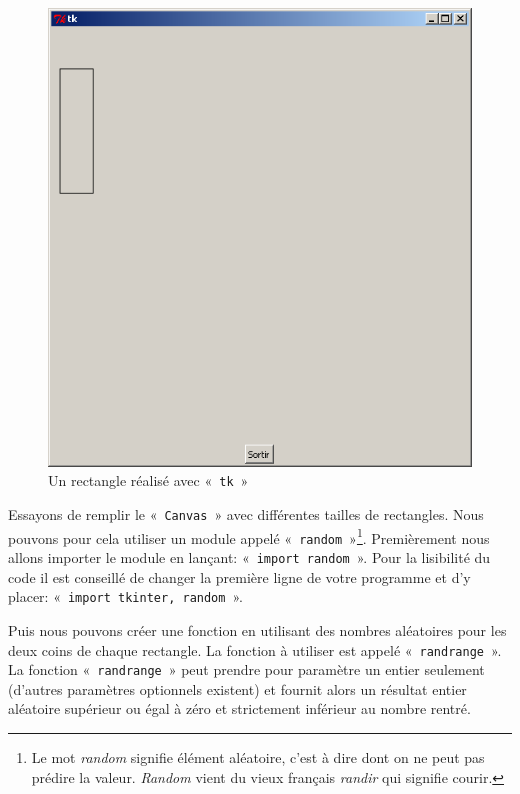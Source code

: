 \begin{figure}[h!]
\centering
\includegraphics[scale=0.4]{images/rectangle}
\caption{Un rectangle réalisé avec « \texttt{tk} »}\label{fig:rectangle}
\end{figure}
 
Essayons de remplir le « \texttt{Canvas} » avec différentes tailles de rectangles. Nous pouvons pour cela utiliser un module appelé « \texttt{random} »\footnote{Le mot \emph{random} signifie élément aléatoire, c'est à dire dont on ne peut pas prédire la valeur. \emph{Random} vient du vieux français \emph{randir} qui signifie courir.}. Premièrement nous allons importer le module en lançant: « \texttt{import random} ». Pour la lisibilité du code il est conseillé de changer la première ligne de votre programme et d'y placer: « \texttt{import tkinter, random} ».

Puis  nous pouvons créer une fonction en utilisant des nombres aléatoires pour les deux coins de chaque rectangle. La fonction à utiliser est appelé « \texttt{randrange} ». La fonction « \texttt{randrange} » peut prendre pour paramètre un entier seulement (d'autres paramètres optionnels existent) et fournit alors un résultat entier aléatoire supérieur ou égal à zéro et strictement inférieur au nombre rentré.

